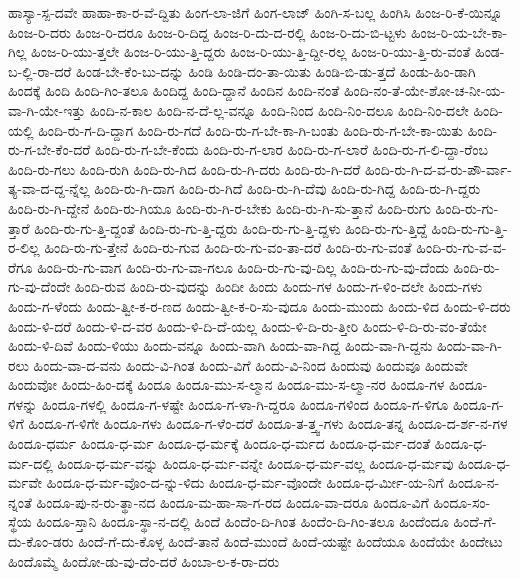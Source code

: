 {ಹಾಸ್ಯಾ-ಸ್ಪ-ದವೇ
ಹಾಹಾ-ಕಾ-ರ-ವೆ-ದ್ದಿತು
ಹಿಂಗ-ಲಾ-ಜಿಗೆ
ಹಿಂಗ-ಲಾಜ್
ಹಿಂಗಿ-ಸ-ಬಲ್ಲ
ಹಿಂಗಿಸಿ
ಹಿಂಜ-ರಿ-ಕೆ-ಯಿನ್ನೂ
ಹಿಂಜ-ರಿ-ದರು
ಹಿಂಜ-ರಿ-ದರೂ
ಹಿಂಜ-ರಿ-ದಿದ್ದ
ಹಿಂಜ-ರಿ-ದು-ದ-ರಲ್ಲಿ
ಹಿಂಜ-ರಿ-ದು-ಬಿ-ಟ್ಟಳು
ಹಿಂಜ-ರಿ-ಯ-ಬೇ-ಕಾ-ಗಿಲ್ಲ
ಹಿಂಜ-ರಿ-ಯು-ತ್ತಲೇ
ಹಿಂಜ-ರಿ-ಯು-ತ್ತಿ-ದ್ದರು
ಹಿಂಜ-ರಿ-ಯು-ತ್ತಿ-ದ್ದೀ-ರಲ್ಲ
ಹಿಂಜ-ರಿ-ಯು-ತ್ತಿ-ರು-ವಂತೆ
ಹಿಂಡ-ಬ-ಲ್ಲಿ-ರಾ-ದರೆ
ಹಿಂಡ-ಬೇ-ಕೆಂ-ಬು-ದನ್ನು
ಹಿಂಡಿ
ಹಿಂಡಿ-ದಂ-ತಾ-ಯಿತು
ಹಿಂಡಿ-ಬಿ-ಡು-ತ್ತದೆ
ಹಿಂಡು-ಹಿಂ-ಡಾಗಿ
ಹಿಂದಕ್ಕೆ
ಹಿಂದಿ
ಹಿಂದಿ-ಗಿಂ-ತಲೂ
ಹಿಂದಿದ್ದ
ಹಿಂದಿ-ದ್ದಾನೆ
ಹಿಂದಿನ
ಹಿಂದಿ-ನಂತೆ
ಹಿಂದಿ-ನಂ-ತೆ-ಯೇ-ಶೋ-ಚ-ನೀ-ಯ-ವಾ-ಗಿ-ಯೇ-ಇತ್ತು
ಹಿಂದಿ-ನ-ಕಾಲ
ಹಿಂದಿ-ನ-ದೆ-ಲ್ಲ-ವನ್ನೂ
ಹಿಂದಿ-ನಿಂದ
ಹಿಂದಿ-ನಿಂ-ದಲೂ
ಹಿಂದಿ-ನಿಂ-ದಲೇ
ಹಿಂದಿ-ಯಲ್ಲಿ
ಹಿಂದಿ-ರು-ಗ-ದಿ-ದ್ದಾಗ
ಹಿಂದಿ-ರು-ಗದೆ
ಹಿಂದಿ-ರು-ಗ-ಬೇ-ಕಾ-ಗಿ-ಬಂತು
ಹಿಂದಿ-ರು-ಗ-ಬೇ-ಕಾ-ಯಿತು
ಹಿಂದಿ-ರು-ಗ-ಬೇ-ಕೆಂ-ದರೆ
ಹಿಂದಿ-ರು-ಗ-ಬೇ-ಕೆಂದು
ಹಿಂದಿ-ರು-ಗ-ಲಾರ
ಹಿಂದಿ-ರು-ಗ-ಲಾರೆ
ಹಿಂದಿ-ರು-ಗ-ಲಿ-ದ್ದಾ-ರೆಂಬ
ಹಿಂದಿ-ರು-ಗಲು
ಹಿಂದಿ-ರುಗಿ
ಹಿಂದಿ-ರು-ಗಿದ
ಹಿಂದಿ-ರು-ಗಿ-ದರು
ಹಿಂದಿ-ರು-ಗಿ-ದರೆ
ಹಿಂದಿ-ರು-ಗಿ-ದ-ವ-ರು-ಪೌ-ರ್ವಾ-ತ್ಯ-ವಾ-ದ-ದ್ದ-ನ್ನೆಲ್ಲ
ಹಿಂದಿ-ರು-ಗಿ-ದಾಗ
ಹಿಂದಿ-ರು-ಗಿದೆ
ಹಿಂದಿ-ರು-ಗಿ-ದೆವು
ಹಿಂದಿ-ರು-ಗಿದ್ದ
ಹಿಂದಿ-ರು-ಗಿ-ದ್ದರು
ಹಿಂದಿ-ರು-ಗಿ-ದ್ದೇನೆ
ಹಿಂದಿ-ರು-ಗಿಯೂ
ಹಿಂದಿ-ರು-ಗಿ-ರ-ಬೇಕು
ಹಿಂದಿ-ರು-ಗಿ-ಸು-ತ್ತಾನೆ
ಹಿಂದಿ-ರುಗು
ಹಿಂದಿ-ರು-ಗು-ತ್ತಾರೆ
ಹಿಂದಿ-ರು-ಗು-ತ್ತಿ-ದ್ದಂತೆ
ಹಿಂದಿ-ರು-ಗು-ತ್ತಿ-ದ್ದರು
ಹಿಂದಿ-ರು-ಗು-ತ್ತಿ-ದ್ದಳು
ಹಿಂದಿ-ರು-ಗು-ತ್ತಿದ್ದೆ
ಹಿಂದಿ-ರು-ಗು-ತ್ತಿ-ರ-ಲಿಲ್ಲ
ಹಿಂದಿ-ರು-ಗು-ತ್ತೇನೆ
ಹಿಂದಿ-ರು-ಗುವ
ಹಿಂದಿ-ರು-ಗು-ವಂ-ತಾ-ದರೆ
ಹಿಂದಿ-ರು-ಗು-ವಂತೆ
ಹಿಂದಿ-ರು-ಗು-ವ-ವ-ರೆಗೂ
ಹಿಂದಿ-ರು-ಗು-ವಾಗ
ಹಿಂದಿ-ರು-ಗು-ವಾ-ಗಲೂ
ಹಿಂದಿ-ರು-ಗು-ವು-ದಿಲ್ಲ
ಹಿಂದಿ-ರು-ಗು-ವು-ದೆಂದು
ಹಿಂದಿ-ರು-ಗು-ವು-ದೆಂದೇ
ಹಿಂದಿ-ರುವ
ಹಿಂದಿ-ರು-ವುದನ್ನು
ಹಿಂದೀ
ಹಿಂದು
ಹಿಂದು-ಗಳ
ಹಿಂದು-ಗ-ಳಿಂ-ದಲೇ
ಹಿಂದು-ಗಳು
ಹಿಂದು-ಗ-ಳೆಂದು
ಹಿಂದು-ತ್ವೀ-ಕ-ರ-ಣದ
ಹಿಂದು-ತ್ವೀ-ಕ-ರಿ-ಸು-ವುದೂ
ಹಿಂದು-ಮುಂದು
ಹಿಂದು-ಳಿದ
ಹಿಂದು-ಳಿ-ದರು
ಹಿಂದು-ಳಿ-ದರೆ
ಹಿಂದು-ಳಿ-ದ-ವರ
ಹಿಂದು-ಳಿ-ದಿ-ದೆ-ಯಲ್ಲ
ಹಿಂದು-ಳಿ-ದಿ-ರು-ತ್ತೀರಿ
ಹಿಂದು-ಳಿ-ದಿ-ರು-ವಂ-ತೆಯೇ
ಹಿಂದು-ಳಿ-ದಿವೆ
ಹಿಂದು-ಳಿಯು
ಹಿಂದು-ವನ್ನೂ
ಹಿಂದು-ವಾಗಿ
ಹಿಂದು-ವಾ-ಗಿದ್ದ
ಹಿಂದು-ವಾ-ಗಿ-ದ್ದನು
ಹಿಂದು-ವಾ-ಗಿ-ರಲು
ಹಿಂದು-ವಾ-ದ-ವನು
ಹಿಂದು-ವಿ-ಗಿಂತ
ಹಿಂದು-ವಿಗೆ
ಹಿಂದು-ವಿ-ನಿಂದ
ಹಿಂದುವು
ಹಿಂದುವೂ
ಹಿಂದುವೇ
ಹಿಂದುವೋ
ಹಿಂದು-ಹಿಂ-ದಕ್ಕೆ
ಹಿಂದೂ
ಹಿಂದೂ-ಮು-ಸ-ಲ್ಮಾನ
ಹಿಂದೂ-ಮು-ಸ-ಲ್ಮಾ-ನರ
ಹಿಂದೂ-ಗಳ
ಹಿಂದೂ-ಗಳನ್ನು
ಹಿಂದೂ-ಗಳಲ್ಲಿ
ಹಿಂದೂ-ಗ-ಳಷ್ಟೇ
ಹಿಂದೂ-ಗ-ಳಾ-ಗಿ-ದ್ದರೂ
ಹಿಂದೂ-ಗಳಿಂದ
ಹಿಂದೂ-ಗ-ಳಿಗೂ
ಹಿಂದೂ-ಗ-ಳಿಗೆ
ಹಿಂದೂ-ಗ-ಳಿಗೇ
ಹಿಂದೂ-ಗಳು
ಹಿಂದೂ-ಗ-ಳೆಂ-ದರೆ
ಹಿಂದೂ-ತ-ತ್ತ್ವ-ಗಳು
ಹಿಂದೂ-ತನ್ನ
ಹಿಂದೂ-ದ-ರ್ಶ-ನ-ಗಳ
ಹಿಂದೂ-ಧರ್ಮ
ಹಿಂದೂ-ಧ-ರ್ಮ
ಹಿಂದೂ-ಧ-ರ್ಮಕ್ಕೆ
ಹಿಂದೂ-ಧ-ರ್ಮದ
ಹಿಂದೂ-ಧ-ರ್ಮ-ದಂತೆ
ಹಿಂದೂ-ಧ-ರ್ಮ-ದಲ್ಲಿ
ಹಿಂದೂ-ಧ-ರ್ಮ-ವನ್ನು
ಹಿಂದೂ-ಧ-ರ್ಮ-ವನ್ನೇ
ಹಿಂದೂ-ಧ-ರ್ಮ-ವಲ್ಲ
ಹಿಂದೂ-ಧ-ರ್ಮವು
ಹಿಂದೂ-ಧ-ರ್ಮವೇ
ಹಿಂದೂ-ಧ-ರ್ಮ-ವೊಂ-ದ-ನ್ನು-ಳಿದು
ಹಿಂದೂ-ಧ-ರ್ಮ-ವೊಂದೇ
ಹಿಂದೂ-ಧ-ರ್ಮೀ-ಯ-ನಿಗೆ
ಹಿಂದೂ-ನ-ನ್ನಂತೆ
ಹಿಂದೂ-ಪು-ನ-ರು-ತ್ಥಾ-ನದ
ಹಿಂದೂ-ಮ-ಹಾ-ಸಾ-ಗ-ರದ
ಹಿಂದೂ-ವಾ-ದರೂ
ಹಿಂದೂ-ವಿಗೆ
ಹಿಂದೂ-ಸಂ-ಸ್ಥೆಯ
ಹಿಂದೂ-ಸ್ತಾನಿ
ಹಿಂದೂ-ಸ್ಥಾ-ನ-ದಲ್ಲಿ
ಹಿಂದೆ
ಹಿಂದೆಂ-ದಿ-ಗಿಂತ
ಹಿಂದೆಂ-ದಿ-ಗಿಂ-ತಲೂ
ಹಿಂದೆಂದೂ
ಹಿಂದೆ-ಗೆ-ದು-ಕೊಂ-ಡರು
ಹಿಂದೆ-ಗೆ-ದು-ಕೊಳ್ಳ
ಹಿಂದೆ-ತಾನೆ
ಹಿಂದೆ-ಮುಂದೆ
ಹಿಂದೆ-ಯಷ್ಟೇ
ಹಿಂದೆಯೂ
ಹಿಂದೆಯೇ
ಹಿಂದೇಟು
ಹಿಂದೊಮ್ಮೆ
ಹಿಂದೋ-ಡು-ವು-ದೆಂ-ದರೆ
ಹಿಂಬಾ-ಲ-ಕ-ರಾ-ದರು
}
